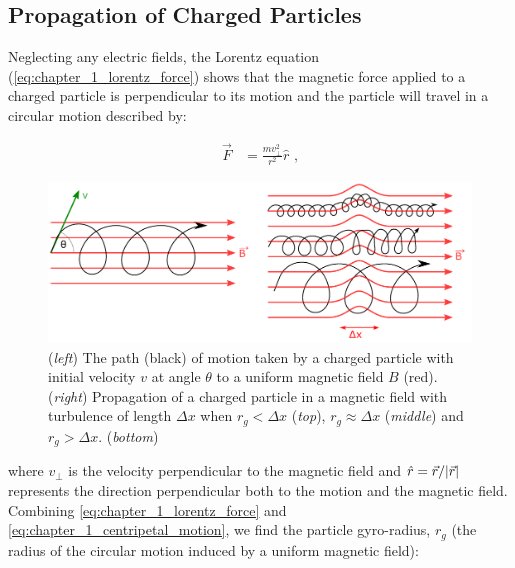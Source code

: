 \subsection{Propagation of Charged Particles} \label{chapter_1_cr_propagation}

Neglecting any electric fields, the Lorentz equation (\autoref{eq:chapter_1_lorentz_force}) shows that the magnetic force applied to a charged particle is perpendicular to its motion and the particle will travel in a circular motion described by:

\begin{equation}
    \begin{aligned}
    \vec{F}&=\frac{mv_\perp^2}{r^2}\hat{r}\text{ ,}
    \end{aligned} \label{eq:chapter_1_centripetal_motion}
\end{equation}
\begin{figure}[b!]
    \centering
    \includegraphics[width=1.0\textwidth]{04_Introduction/Images/cosmic_rays/combined_turbulence.pdf}
    \caption{ (\textit{left}) The path (black) of motion taken by a charged particle with initial velocity $v$ at angle $\theta$ to a uniform magnetic field $B$ (red). (\textit{right}) Propagation of a charged particle in a magnetic field  with turbulence of length $\Delta x$ when $r_g<\Delta x$ (\textit{top}), $r_g\approx \Delta x$ (\textit{middle}) and $r_g>\Delta x$. (\textit{bottom})}
    \label{fig:01_CR_in_Bfield}
\end{figure}

\noindent where $v_\perp$ is the velocity perpendicular to the magnetic field and $\hat{r}=\vec{r}/\abs{\vec{r}}$ represents the direction perpendicular both to the motion and the magnetic field. Combining \autoref{eq:chapter_1_lorentz_force} and \autoref{eq:chapter_1_centripetal_motion}, we find the particle gyro-radius, $r_g$ (the radius of the circular motion induced by a uniform magnetic field):

